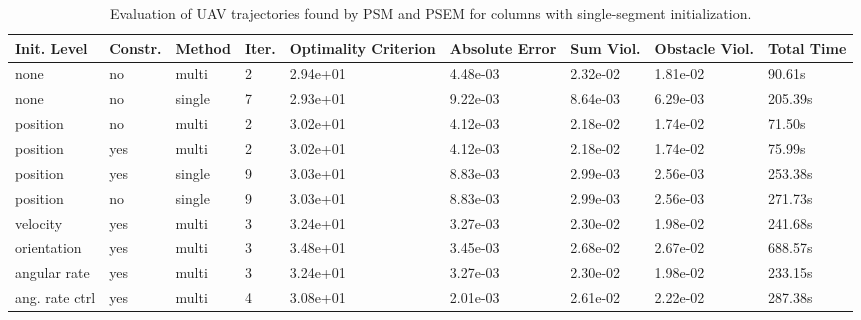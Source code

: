 \begin{table}
\small

\caption{Evaluation of UAV trajectories found by PSM and PSEM for columns with single-segment initialization.}
\label{tab:traj-plan-eval-columns-single}
\begin{tabular}{p{21mm}p{9mm}p{12mm}p{6mm}p{14mm}p{14mm}p{14mm}p{14mm}p{14mm}}
\toprule
Init. Level & Constr. & Method & Iter. & Optimality Criterion & Absolute Error & Sum Viol. & Obstacle Viol. & Total Time \\
\midrule
none & no & multi & \cellcolor{color3} 2 & 2.94e+01 & 4.48e-03 & 2.32e-02 & 1.81e-02 & 90.61s \\
none & no & single & 7 & \cellcolor{color3} 2.93e+01 & \cellcolor{color8} 9.22e-03 & 8.64e-03 & 6.29e-03 & 205.39s \\
position & no & multi & \cellcolor{color3} 2 & 3.02e+01 & 4.12e-03 & 2.18e-02 & 1.74e-02 & \cellcolor{color3} 71.50s \\
position & yes & multi & \cellcolor{color3} 2 & 3.02e+01 & 4.12e-03 & 2.18e-02 & 1.74e-02 & 75.99s \\
position & yes & single & \cellcolor{color8} 9 & 3.03e+01 & 8.83e-03 & \cellcolor{color3} 2.99e-03 & \cellcolor{color3} 2.56e-03 & 253.38s \\
position & no & single & \cellcolor{color8} 9 & 3.03e+01 & 8.83e-03 & \cellcolor{color3} 2.99e-03 & \cellcolor{color3} 2.56e-03 & 271.73s \\
velocity & yes & multi & 3 & 3.24e+01 & 3.27e-03 & 2.30e-02 & 1.98e-02 & 241.68s \\
orientation & yes & multi & 3 & \cellcolor{color8} 3.48e+01 & 3.45e-03 & \cellcolor{color8} 2.68e-02 & \cellcolor{color8} 2.67e-02 & \cellcolor{color8} 688.57s \\
angular rate & yes & multi & 3 & 3.24e+01 & 3.27e-03 & 2.30e-02 & 1.98e-02 & 233.15s \\
ang. rate ctrl & yes & multi & 4 & 3.08e+01 & \cellcolor{color3} 2.01e-03 & 2.61e-02 & 2.22e-02 & 287.38s \\
\bottomrule
\end{tabular}
\end{table}
